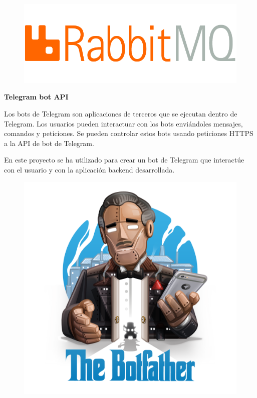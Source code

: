 \begin{figure}[h]
	\centering
	\includegraphics[scale=0.2]{images/21}
\end{figure}

\textbf{Telegram bot API} 

Los bots de Telegram \cite{ref24} son aplicaciones de terceros que se ejecutan dentro de Telegram. Los usuarios pueden interactuar con los bots enviándoles mensajes, comandos y peticiones. Se pueden controlar estos bots usando peticiones HTTPS a la API de bot de Telegram.

En este proyecto se ha utilizado para crear un bot de Telegram que interactúe con el usuario y con la aplicación backend desarrollada.

\begin{figure}[h]
	\centering
	\includegraphics[scale=0.1]{images/22}
\end{figure}


